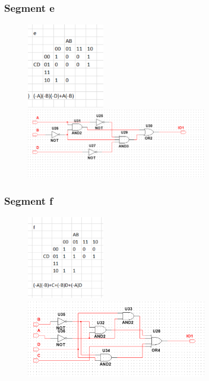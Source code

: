 \documentclass[12pt,a4paper]{article}
\begin{document}
\subsubsection{Segment e}
\begin{figure}[H]
\centering
\includegraphics[width=0.3\textwidth]{7seg/seg4}
\includegraphics[width=0.7\textwidth]{7seg/seg4circ}
\end{figure}

\newpage
\subsubsection{Segment f}
\begin{figure}[H]
\centering
\includegraphics[width=0.3\textwidth]{7seg/seg5}
\includegraphics[width=0.7\textwidth]{7seg/seg5circ}
\end{figure}
\end{document}
